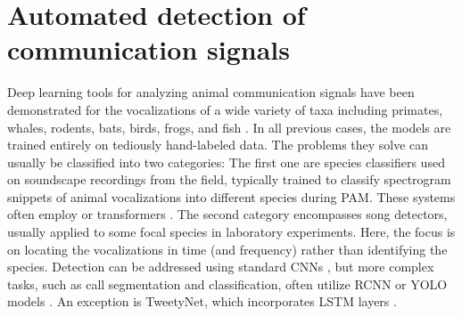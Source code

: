 \section{Automated detection of communication signals}

Deep learning tools for analyzing animal communication signals have been
demonstrated for the vocalizations of a wide variety of taxa including
primates, whales, rodents, bats, birds, frogs, and fish
\parencite{coffeyDeepSqueakDeepLearningbased2019,
cohenAutomatedAnnotationBirdsong2022, bellafkirBatEcholocationCall2022,
berglerORCASPOTAutomaticKiller2019, lawsonAutomatedAcousticDetection2023a,
kimuraEvaluationDeepLearningBased2023,
waddellApplyingArtificialIntelligence2021, erbsAutomatedLongtermAcoustic2023}.
In all previous cases, the models are trained entirely on tediously
hand-labeled data. The problems they solve can usually be classified into two
categories: The first one are species classifiers used on soundscape
recordings from the field, typically trained to classify spectrogram snippets
of animal vocalizations into different species during \acrfull{PAM}. These
systems often employ  \parencite{kahlBirdNETDeepLearning2021,
kimuraEvaluationDeepLearningBased2023,
waddellApplyingArtificialIntelligence2021} or transformers
\parencite{bellafkirBatEcholocationCall2022}. The second category encompasses
song detectors, usually applied to some focal species in laboratory
experiments. Here, the focus is on locating the vocalizations in time (and
frequency) rather than identifying the species. Detection can be addressed
using standard CNNs \parencite{berglerORCASPOTAutomaticKiller2019}, but more
complex tasks, such as call segmentation and classification, often utilize RCNN
or YOLO models \parencite{coffeyDeepSqueakDeepLearningbased2019,
katherDevelopmentMachineLearning2024, lawsonAutomatedAcousticDetection2023a}.
An exception is TweetyNet, which incorporates \acrfull{LSTM} layers
\parencite{cohenAutomatedAnnotationBirdsong2022}.

